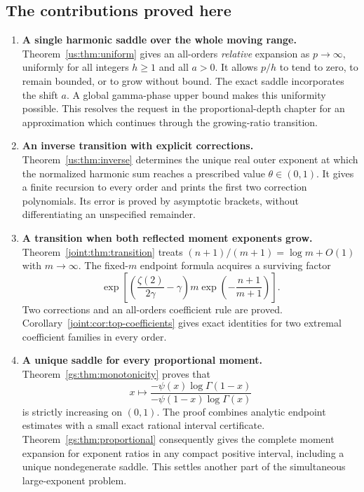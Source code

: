 \documentclass[11pt,a4paper]{article}
\numberwithin{equation}{section}
\theoremstyle{plain}
\theoremstyle{definition}
\theoremstyle{remark}
\begin{document}
\subsection{The contributions proved here}

\begin{enumerate}[leftmargin=*,label=\arabic*.]
\item \textbf{A single harmonic saddle over the whole moving range.}
Theorem~\ref{us:thm:uniform} gives an all-orders \emph{relative}
expansion as $p\to\infty$, uniformly for all integers $h\ge1$ and
all $a>0$. It allows $p/h$ to tend to zero, to remain bounded, or to
grow without bound. The exact saddle incorporates the shift $a$.
A global gamma-phase upper bound makes this uniformity possible.
This resolves the request in the proportional-depth chapter for an
approximation which continues through the growing-ratio transition.

\item \textbf{An inverse transition with explicit corrections.}
Theorem~\ref{us:thm:inverse} determines the unique real outer exponent
at which the normalized harmonic sum reaches a prescribed value
$\theta\in(0,1)$. It gives a finite recursion to every order and
prints the first two correction polynomials. Its error is proved by
asymptotic brackets, without differentiating an unspecified remainder.

\item \textbf{A transition when both reflected moment exponents grow.}
Theorem~\ref{joint:thm:transition} treats
$(n+1)/(m+1)=\log m+O(1)$ with $m\to\infty$. The fixed-$m$
endpoint formula acquires a surviving factor
\[
 \exp\!\left[\left(\frac{\zeta(2)}{2\gamma}-\gamma\right)
       m\exp\!\left(-\frac{n+1}{m+1}\right)\right].
\]
Two corrections and an all-orders coefficient rule are proved.
Corollary~\ref{joint:cor:top-coefficients} gives exact identities for
two extremal coefficient families in every order.

\item \textbf{A unique saddle for every proportional moment.}
Theorem~\ref{gs:thm:monotonicity} proves that
\[
 x\longmapsto
 \frac{-\psi(x)\log\Gamma(1-x)}
      {-\psi(1-x)\log\Gamma(x)}
\]
is strictly increasing on $(0,1)$. The proof combines analytic
endpoint estimates with a small exact rational interval certificate.
Theorem~\ref{gs:thm:proportional} consequently gives the complete
moment expansion for exponent ratios in any compact positive
interval, including a unique nondegenerate saddle. This settles
another part of the simultaneous large-exponent problem.


\end{enumerate}
\end{document}
